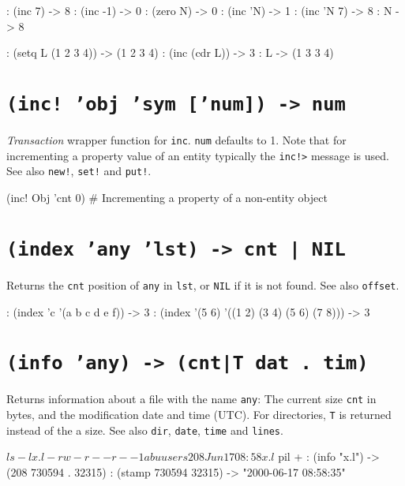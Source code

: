 \begin{wideverbatim}
: (inc 7)
-> 8
: (inc -1)
-> 0
: (zero N)
-> 0
: (inc 'N)
-> 1
: (inc 'N 7)
-> 8
: N
-> 8

: (setq L (1 2 3 4))
-> (1 2 3 4)
: (inc (cdr L))
-> 3
: L
-> (1 3 3 4)
\end{wideverbatim}

 
\section*{\texttt{(inc! 'obj 'sym ['num]) -> num}}
\label{sec:func-ref-I-(inc! 'obj 'sym ['num]) -> num}


\emph{Transaction} wrapper function for \texttt{inc}. \texttt{num}
defaults to 1. Note that for incrementing a property value of an entity
typically the \texttt{inc!>} message is used. See also \texttt{new!}, \texttt{set!} and
\texttt{put!}.


\begin{wideverbatim}
(inc! Obj 'cnt 0)  # Incrementing a property of a non-entity object
\end{wideverbatim}

 
\section*{\texttt{(index 'any 'lst) -> cnt | NIL}}
\label{sec:func-ref-I-(index 'any 'lst) -> cnt | NIL}


Returns the \texttt{cnt} position of \texttt{any} in \texttt{lst}, or \texttt{NIL} if it is not
found. See also \texttt{offset}.


\begin{wideverbatim}
: (index 'c '(a b c d e f))
-> 3
: (index '(5 6) '((1 2) (3 4) (5 6) (7 8)))
-> 3
\end{wideverbatim}

 
\section*{\texttt{(info 'any) -> (cnt|T dat . tim)}}
\label{sec:func-ref-I-(info 'any) -> (cnt|T dat . tim)}


Returns information about a file with the name \texttt{any}: The current size
\texttt{cnt} in bytes, and the modification date and time (UTC). For
directories, \texttt{T} is returned instead of the a size. See also \texttt{dir},
\texttt{date}, \texttt{time} and \texttt{lines}.


\begin{wideverbatim}
$ ls -l x.l
-rw-r--r--   1 abu      users         208 Jun 17 08:58 x.l
$ pil +
: (info "x.l")
-> (208 730594 . 32315)
: (stamp 730594 32315)
-> "2000-06-17 08:58:35"
\end{wideverbatim}

